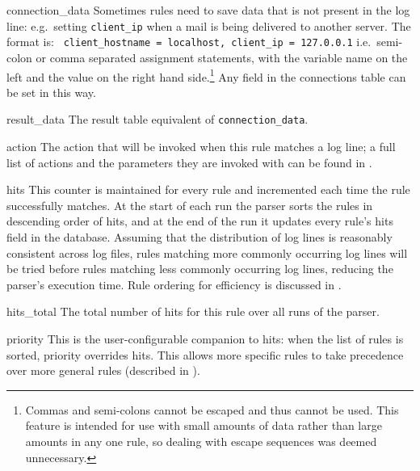 \begin{eqlist}
    \item [connection\_data] Sometimes rules need to save data that is not
        present in the log line: e.g.\ setting \texttt{client\_ip} when a
        mail is being delivered to another server.  The format is:
        \newline{} \tab{} \texttt{ client\_hostname = localhost, client\_ip
        = 127.0.0.1} \newline{} i.e.\ semi-colon or comma separated
        assignment statements, with the variable name on the left and the
        value on the right hand side.\footnote{Commas and semi-colons
        cannot be escaped and thus cannot be used.  This feature is
        intended for use with small amounts of data rather than large
        amounts in any one rule, so dealing with escape sequences was
        deemed unnecessary.}  Any field in the connections table can be set
        in this way.

    \item [result\_data] The result table equivalent of
        \texttt{connection\_data}.

    \item [action] The action that will be invoked when this rule matches a
        log line; a full list of actions and the parameters they are
        invoked with can be found in .

    \item [hits] This counter is maintained for every rule and incremented
        each time the rule successfully matches.  At the start of each run
        the parser sorts the rules in descending order of hits, and at the
        end of the run it updates every rule's hits field in the database.
        Assuming that the distribution of log lines is reasonably
        consistent across log files, rules matching more commonly occurring
        log lines will be tried before rules matching less commonly
        occurring log lines, reducing the parser's execution time.  Rule
        ordering for efficiency is discussed in .

    \item [hits\_total] The total number of hits for this rule over all
        runs of the parser.

    \item [priority] This is the user-configurable companion to hits: when
        the list of rules is sorted, priority overrides hits.  This allows
        more specific rules to take precedence over more general rules
        (described in ).


\end{eqlist}

